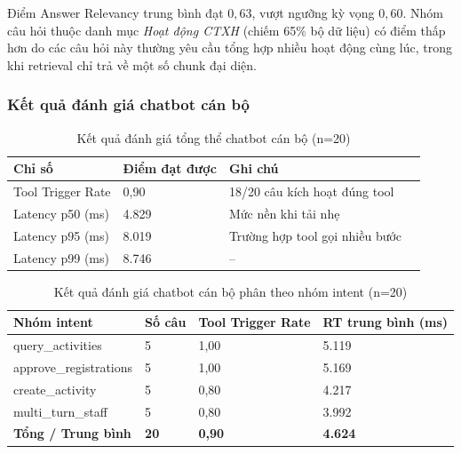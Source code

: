 Điểm Answer Relevancy trung bình đạt $0{,}63$, vượt ngưỡng kỳ vọng $0{,}60$. Nhóm câu hỏi thuộc danh mục \textit{Hoạt động CTXH} (chiếm 65\% bộ dữ liệu) có điểm thấp hơn do các câu hỏi này thường yêu cầu tổng hợp nhiều hoạt động cùng lúc, trong khi retrieval chỉ trả về một số chunk đại diện.

\subsubsection{Kết quả đánh giá chatbot cán bộ}

\begin{table}[H]
\centering
\renewcommand{\arraystretch}{1.3}
\small
\begin{tabular}{|p{4.5cm}|p{2.2cm}|p{2.2cm}|p{2.8cm}|}
\hline
\textbf{Chỉ số} & \textbf{Điểm đạt được} & \textbf{Ghi chú} \\
\hline
Tool Trigger Rate & 0{,}90 & 18/20 câu kích hoạt đúng tool \\
\hline
Latency p50 (ms) & 4.829 & Mức nền khi tải nhẹ \\
\hline
Latency p95 (ms) & 8.019 & Trường hợp tool gọi nhiều bước \\
\hline
Latency p99 (ms) & 8.746 & -- \\
\hline
\end{tabular}
\caption{Kết quả đánh giá tổng thể chatbot cán bộ (n=20)}
\end{table}

\begin{table}[H]
\centering
\renewcommand{\arraystretch}{1.3}
\small
\begin{tabular}{|p{4.2cm}|p{1.5cm}|p{3.0cm}|p{2.5cm}|}
\hline
\textbf{Nhóm intent} & \textbf{Số câu} & \textbf{Tool Trigger Rate} & \textbf{RT trung bình (ms)} \\
\hline
query\_activities & 5 & 1{,}00 & 5.119 \\
\hline
approve\_registrations & 5 & 1{,}00 & 5.169 \\
\hline
create\_activity & 5 & 0{,}80 & 4.217 \\
\hline
multi\_turn\_staff & 5 & 0{,}80 & 3.992 \\
\hline
\textbf{Tổng / Trung bình} & \textbf{20} & \textbf{0{,}90} & \textbf{4.624} \\
\hline
\end{tabular}
\caption{Kết quả đánh giá chatbot cán bộ phân theo nhóm intent (n=20)}
\end{table}

